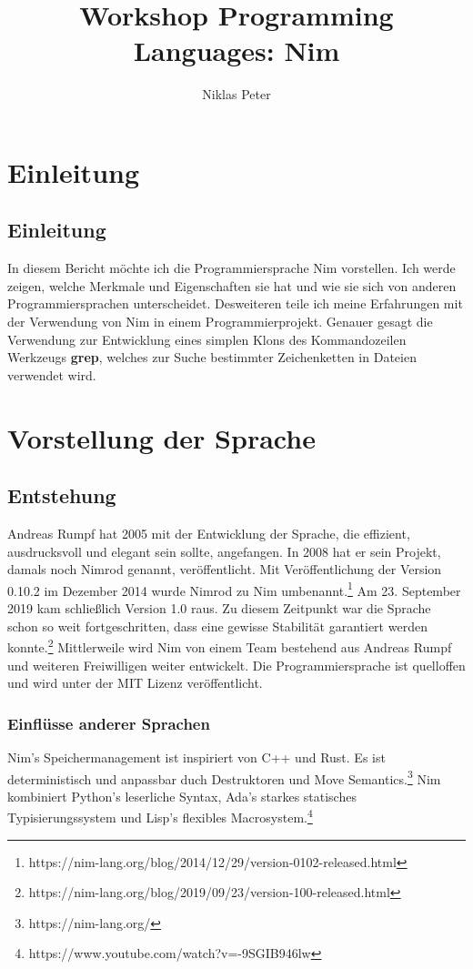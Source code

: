 \documentclass[11pt]{report}
\title{\textbf{Workshop Programming Languages: Nim}}
\author{Niklas Peter}
\date{}
\begin{document}
\maketitle
\tableofcontents


\chapter{Einleitung}
\section{Einleitung}
In diesem Bericht möchte ich die Programmiersprache Nim vorstellen. Ich werde zeigen, welche Merkmale und Eigenschaften sie hat und wie sie sich von anderen Programmiersprachen unterscheidet. Desweiteren teile ich meine Erfahrungen mit der Verwendung von Nim in einem Programmierprojekt. Genauer gesagt die Verwendung zur Entwicklung eines simplen Klons des Kommandozeilen Werkzeugs \textbf{grep}, welches zur Suche bestimmter Zeichenketten in Dateien verwendet wird.



\chapter{Vorstellung der Sprache}

\section{Entstehung}
Andreas Rumpf hat 2005 mit der Entwicklung der Sprache, die effizient, ausdrucksvoll und elegant sein sollte, angefangen. In 2008 hat er sein Projekt, damals noch Nimrod genannt, veröffentlicht. Mit Veröffentlichung der Version 0.10.2 im Dezember 2014 wurde Nimrod zu Nim umbenannt.\footnote{https://nim-lang.org/blog/2014/12/29/version-0102-released.html} Am 23. September 2019 kam schließlich Version 1.0 raus. Zu diesem Zeitpunkt war die Sprache schon so weit fortgeschritten, dass eine gewisse Stabilität garantiert werden konnte.\footnote{https://nim-lang.org/blog/2019/09/23/version-100-released.html} Mittlerweile wird Nim von einem Team bestehend aus Andreas Rumpf und weiteren Freiwilligen weiter entwickelt. Die Programmiersprache ist quelloffen und wird unter der MIT Lizenz veröffentlicht.

\subsection{Einflüsse anderer Sprachen}
Nim's Speichermanagement ist inspiriert von C++ und Rust. Es ist deterministisch und anpassbar duch Destruktoren und Move Semantics.\footnote{https://nim-lang.org/}
\newline
Nim kombiniert Python's leserliche Syntax, Ada's starkes statisches Typisierungssystem und Lisp's flexibles Macrosystem.\footnote{https://www.youtube.com/watch?v=-9SGIB946lw}
\end{document}
